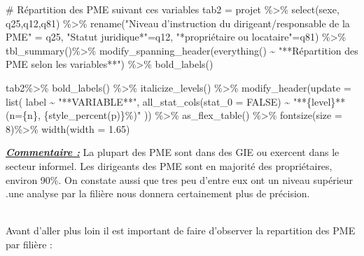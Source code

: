 \documentclass[
  letterpaper,
  DIV=11,
  numbers=noendperiod]{scrartcl}
\newenvironment{Shaded}{\begin{snugshade}}{\end{snugshade}}
\newcommand{\AttributeTok}[1]{\textcolor[rgb]{0.40,0.45,0.13}{#1}}
\newcommand{\CommentTok}[1]{\textcolor[rgb]{0.37,0.37,0.37}{#1}}
\newcommand{\ConstantTok}[1]{\textcolor[rgb]{0.56,0.35,0.01}{#1}}
\newcommand{\DecValTok}[1]{\textcolor[rgb]{0.68,0.00,0.00}{#1}}
\newcommand{\FloatTok}[1]{\textcolor[rgb]{0.68,0.00,0.00}{#1}}
\newcommand{\FunctionTok}[1]{\textcolor[rgb]{0.28,0.35,0.67}{#1}}
\newcommand{\NormalTok}[1]{\textcolor[rgb]{0.00,0.23,0.31}{#1}}
\newcommand{\OtherTok}[1]{\textcolor[rgb]{0.00,0.23,0.31}{#1}}
\newcommand{\SpecialCharTok}[1]{\textcolor[rgb]{0.37,0.37,0.37}{#1}}
\newcommand{\StringTok}[1]{\textcolor[rgb]{0.13,0.47,0.30}{#1}}
\begin{document}
\begin{Shaded}
\begin{Highlighting}[]
\CommentTok{\# Répartition des PME suivant ces variables}
\NormalTok{tab2 }\OtherTok{=}\NormalTok{  projet }\SpecialCharTok{\%\textgreater{}\%}
                  \FunctionTok{select}\NormalTok{(sexe, q25,q12,q81) }\SpecialCharTok{\%\textgreater{}\%}
                      \FunctionTok{rename}\NormalTok{(}\StringTok{"Niveau d’instruction du dirigeant/responsable de la PME"} \OtherTok{=}\NormalTok{ q25, }\StringTok{"Statut juridique*"}\OtherTok{=}\NormalTok{q12, }\StringTok{"*propriétaire ou locataire"}\OtherTok{=}\NormalTok{q81) }\SpecialCharTok{\%\textgreater{}\%} 
                         \FunctionTok{tbl\_summary}\NormalTok{()}\SpecialCharTok{\%\textgreater{}\%}
                                \FunctionTok{modify\_spanning\_header}\NormalTok{(}\FunctionTok{everything}\NormalTok{() }\SpecialCharTok{\textasciitilde{}} \StringTok{"**Répartition des PME selon les variables**"}\NormalTok{) }\SpecialCharTok{\%\textgreater{}\%} 
                                        \FunctionTok{bold\_labels}\NormalTok{()}

\NormalTok{tab2}\SpecialCharTok{\%\textgreater{}\%} \FunctionTok{bold\_labels}\NormalTok{() }\SpecialCharTok{\%\textgreater{}\%} 
  \FunctionTok{italicize\_levels}\NormalTok{()  }\SpecialCharTok{\%\textgreater{}\%} 
  \FunctionTok{modify\_header}\NormalTok{(}\AttributeTok{update =} \FunctionTok{list}\NormalTok{( label }\SpecialCharTok{\textasciitilde{}} \StringTok{"**VARIABLE**"}\NormalTok{, }\FunctionTok{all\_stat\_cols}\NormalTok{(}\AttributeTok{stat\_0 =} \ConstantTok{FALSE}\NormalTok{) }\SpecialCharTok{\textasciitilde{}} \StringTok{"**\{level\}** (n=\{n\}, \{style\_percent(p)\}\%)"}
\NormalTok{  )) }\SpecialCharTok{\%\textgreater{}\%}  \FunctionTok{as\_flex\_table}\NormalTok{() }\SpecialCharTok{\%\textgreater{}\%}
             \FunctionTok{fontsize}\NormalTok{(}\AttributeTok{size =} \DecValTok{8}\NormalTok{)}\SpecialCharTok{\%\textgreater{}\%}
                   \FunctionTok{width}\NormalTok{(}\AttributeTok{width =} \FloatTok{1.65}\NormalTok{) }
\end{Highlighting}
\end{Shaded}

\ul{\textbf{\emph{Commentaire :}}} La plupart des PME sont dans des GIE
ou exercent dans le secteur informel. Les dirigeants des PME sont en
majorité des propriétaires, environ 90\%. On constate aussi que tres peu
d'entre eux ont un niveau supérieur .une analyse par la filière nous
donnera certainement plus de précision.\\
\strut \\
Avant d'aller plus loin il est important de faire d'observer la
repartition des PME par filière :
\end{document}

